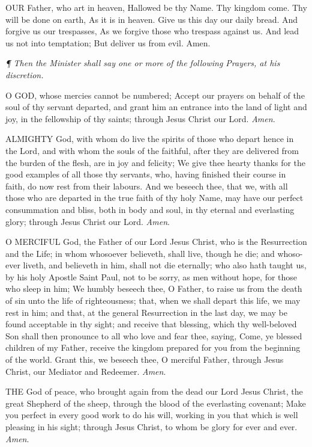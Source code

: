 OUR
Father, who art in heaven, Hallowed be thy Name. Thy kingdom come. Thy
will be done on earth, As it is in heaven. Give us this day our daily
bread. And forgive us our trespasses, As we forgive those who trespass
against us. And lead us not into temptation; But deliver us from evil.
Amen.

\emph{¶
Then the Minister shall say one or more of the following Prayers, at his
discretion.}

O
GOD, whose mercies cannot be numbered; Accept our prayers on behalf of
the soul of thy servant departed, and grant him an entrance into the land
of light and joy, in the fellowship of thy saints; through Jesus Christ
our Lord. \emph{Amen}.

ALMIGHTY
God, with whom do live the spirits of those who depart hence in the Lord,
and with whom the souls of the faithful, after they are delivered from
the burden of the flesh, are in joy and felicity; We give thee hearty
thanks for the good examples of all those thy servants, who, having finished
their course in faith, do now rest from their labours. And we beseech
thee, that we, with all those who are departed in the true faith of thy
holy Name, may have our perfect consummation and bliss, both in body and
soul, in thy eternal and everlasting glory; through Jesus Christ our Lord.
\emph{Amen}.

O
MERCIFUL God, the Father of our Lord Jesus Christ, who is the Resurrection
and the Life; in whom whosoever believeth, shall live, though he die;
and whoso-ever liveth, and believeth in him, shall not die eternally;
who also hath taught us, by his holy Apostle Saint Paul, not to be sorry,
as men without hope, for those who sleep in him; We humbly beseech thee,
O Father, to raise us from the death of sin unto the life of righteousness;
that, when we shall depart this life, we may rest in him; and that, at
the general Resurrection in the last day, we may be found acceptable in
thy sight; and receive that blessing, which thy well-beloved Son shall
then pronounce to all who love and fear thee, saying, Come, ye blessed
children of my Father, receive the kingdom prepared for you from the beginning
of the world. Grant this, we beseech thee, O merciful Father, through
Jesus Christ, our Mediator and Redeemer. \emph{Amen}.

THE
God of peace, who brought again from the dead our Lord Jesus Christ, the
great Shepherd of the sheep, through the blood of the everlasting covenant;
Make you perfect in every good work to do his will, working in you that
which is well pleasing in his sight; through Jesus Christ, to whom be
glory for ever and ever. \emph{Amen}.

